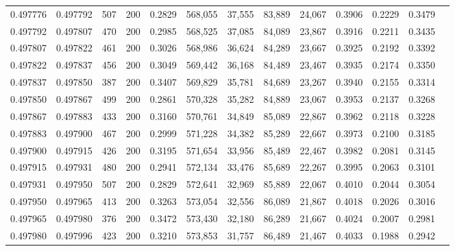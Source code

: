 \begin{tabular}{rrrrrrrrrrrrr}
0.497776 & 0.497792 &   507 & 200 &                                     0.2829 & 568,055 &  37,555 &  83,889 &  24,067 & 0.3906 & 0.2229 & 0.3479 \\
0.497792 & 0.497807 &   470 & 200 &                                     0.2985 & 568,525 &  37,085 &  84,089 &  23,867 & 0.3916 & 0.2211 & 0.3435 \\
0.497807 & 0.497822 &   461 & 200 &                                     0.3026 & 568,986 &  36,624 &  84,289 &  23,667 & 0.3925 & 0.2192 & 0.3392 \\
0.497822 & 0.497837 &   456 & 200 &                                     0.3049 & 569,442 &  36,168 &  84,489 &  23,467 & 0.3935 & 0.2174 & 0.3350 \\
0.497837 & 0.497850 &   387 & 200 &                                     0.3407 & 569,829 &  35,781 &  84,689 &  23,267 & 0.3940 & 0.2155 & 0.3314 \\
0.497850 & 0.497867 &   499 & 200 &                                     0.2861 & 570,328 &  35,282 &  84,889 &  23,067 & 0.3953 & 0.2137 & 0.3268 \\
0.497867 & 0.497883 &   433 & 200 &                                     0.3160 & 570,761 &  34,849 &  85,089 &  22,867 & 0.3962 & 0.2118 & 0.3228 \\
0.497883 & 0.497900 &   467 & 200 &                                     0.2999 & 571,228 &  34,382 &  85,289 &  22,667 & 0.3973 & 0.2100 & 0.3185 \\
0.497900 & 0.497915 &   426 & 200 &                                     0.3195 & 571,654 &  33,956 &  85,489 &  22,467 & 0.3982 & 0.2081 & 0.3145 \\
0.497915 & 0.497931 &   480 & 200 &                                     0.2941 & 572,134 &  33,476 &  85,689 &  22,267 & 0.3995 & 0.2063 & 0.3101 \\
0.497931 & 0.497950 &   507 & 200 &                                     0.2829 & 572,641 &  32,969 &  85,889 &  22,067 & 0.4010 & 0.2044 & 0.3054 \\
0.497950 & 0.497965 &   413 & 200 &                                     0.3263 & 573,054 &  32,556 &  86,089 &  21,867 & 0.4018 & 0.2026 & 0.3016 \\
0.497965 & 0.497980 &   376 & 200 &                                     0.3472 & 573,430 &  32,180 &  86,289 &  21,667 & 0.4024 & 0.2007 & 0.2981 \\
0.497980 & 0.497996 &   423 & 200 &                                     0.3210 & 573,853 &  31,757 &  86,489 &  21,467 & 0.4033 & 0.1988 & 0.2942 \\

\end{tabular}
